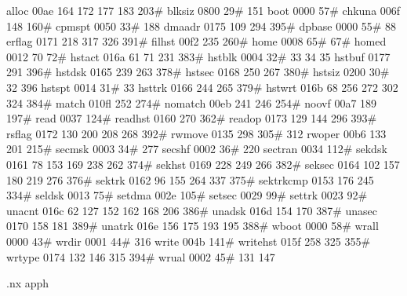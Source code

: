 alloc          00ae    164    172    177    183    203#
blksiz         0800     29#   151
boot           0000     57#
chkuna         006f    148    160#
cpmspt         0050     33#   188
dmaadr         0175    109    294    395#
dpbase         0000     55#    88
erflag         0171    218    317    326    391#
filhst         00f2    235    260#
home           0008     65#    67#
homed          0012     70     72#
hstact         016a     61     71    231    383#
hstblk         0004     32#    33     34     35
hstbuf         0177    291    396#
hstdsk         0165    239    263    378#
hstsec         0168    250    267    380#
hstsiz         0200     30#    32    396
hstspt         0014     31#    33
hsttrk         0166    244    265    379#
hstwrt         016b     68    256    272    302    324    384#
match          010fl   252    274#
nomatch        00eb    241    246    254#
noovf          00a7    189    197#
read           0037    124#
readhst        0160    270    362#
readop         0173    129    144    296    393#
rsflag         0172    130    200    208    268    392#
rwmove         0135    298    305#   312
rwoper         00b6    133    201    215#
secmsk         0003     34#   277
secshf         0002     36#   220
sectran        0034    112#
sekdsk         0161     78    153    169    238    262    374#
sekhst         0169    228    249    266    382#
seksec         0164    102    157    180    219    276    376#
sektrk         0162     96    155    264    337    375#
sektrkcmp      0153    176    245    334#
seldsk         0013     75#
setdma         002e    105#
setsec         0029     99#
settrk         0023     92#
unacnt         016c     62    127    152    162    168    206    386#
unadsk         016d    154    170    387#
unasec         0170    158    181    389#
unatrk         016e    156    175    193    195    388#
wboot          0000     58#
wrall          0000     43#
wrdir          0001     44#   316
write          004b    141#
writehst       015f    258    325    355#
wrtype         0174    132    146    315    394#
wrual          0002     45#   131    147

.nx apph
